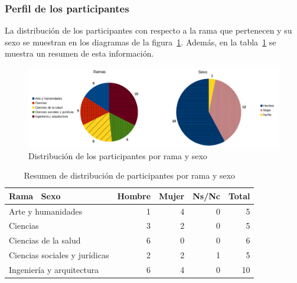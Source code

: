 \subsubsection{Perfil de los participantes}

La distribución de los participantes con respecto a la rama que pertenecen y su sexo se muestran en los diagramas de la figura~\ref{fig:cap:encuesta:ramaysexo}. Además, en la tabla~\ref{tab:cap:encuesta:rama:sexo} se muestra un resumen de esta información.


\begin{figure}
  \begin{center}
    \includegraphics[scale=0.3]{JornadasPoblacion.png}
  \end{center}
  \caption{Distribución de los participantes por rama y sexo}
  \label{fig:cap:encuesta:ramaysexo}
\end{figure}


\begin{table}
  \begin{center}
  \begin{tabular}{| l | r | r | r | r |}
    \hline
    Rama \ Sexo & Hombre & Mujer & Ns/Nc & Total \\
    \hline
    \hline
    Arte y humanidades & 1 & 4 & 0 & 5  \\
    \hline
    Ciencias & 3 & 2 & 0 & 5  \\
    \hline
    Ciencias de la salud & 6 & 0 & 0 & 6  \\
    \hline
    Ciencias sociales y jurídicas & 2 & 2 & 1 & 5  \\
    \hline
    Ingeniería y arquitectura & 6 & 4 & 0 & 10 \\
    \hline
  \end{tabular}
\end{center}
\caption{Resumen de distribución de participantes por rama y sexo}
\label{tab:cap:encuesta:rama:sexo}
\end{table}



